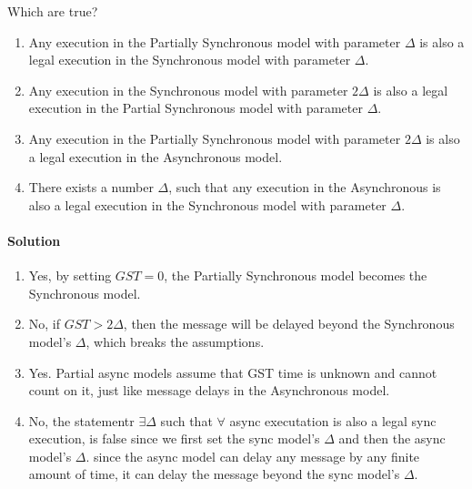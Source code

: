 \begin{xca}[Quiz 1.D]
    Which are true?
    \begin{enumerate}
        \item Any execution in the Partially Synchronous model with parameter
         $\Delta$ is also a legal execution in the Synchronous model with parameter $\Delta$.

        \item Any execution in the Synchronous model with parameter 
        $2 \Delta$ is also a legal execution in the Partial Synchronous model with parameter $\Delta$.

        \item Any execution in the Partially Synchronous model with parameter 
        $2\Delta$ is also a legal execution in the Asynchronous model.

        \item There exists a number $\Delta$, such that any execution in the Asynchronous 
        is also a legal execution in the Synchronous model with parameter $\Delta$.
    \end{enumerate}
    
    \paragraph{Solution}
    \begin{enumerate}
        \item Yes, by setting $GST=0$, the Partially Synchronous model becomes the Synchronous model.

        \item No, if $GST > 2\Delta$, then the message will be
        delayed beyond the Synchronous model's $\Delta$, which breaks the assumptions.

        \item Yes. Partial async models assume that GST time is unknown and cannot count on it, just like 
        message delays in the Asynchronous model.

        \item No, the statementr $\exists \Delta$ such that $\forall$ async executation is also a legal sync execution,
        is false since we first set the sync model's $\Delta$ and then the async model's $\Delta$.
        since the async model can delay any message by any finite amount of time, it can delay the message beyond the sync model's $\Delta$.

    \end{enumerate}
\end{xca}



